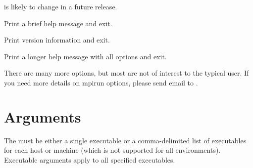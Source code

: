 \documentclass[english]{article}
\begin{document}
\begin{Description}
is likely to change in a future release.
\item[\Opt{-h}\Bar\Opt{-help}] Print a brief help message and exit.
\item[\Opt{-version}] Print version information and exit.
\item[\Opt{-list-options}] Print a longer help message with all options and exit.
\end{Description}

There are many more options, but most are not of interest to the typical user. If you need more details on mpirun options,
please send email to . 

\section{Arguments}
The  must be either a single executable or a comma-delimited list of executables for each host or machine 
(which is not supported for all environments). Executable arguments apply to all specified executables. 
\end{document}
